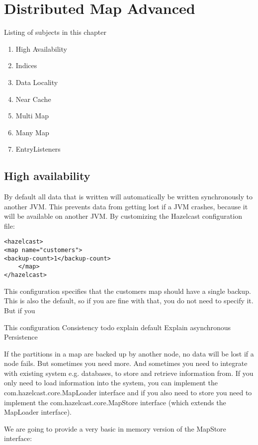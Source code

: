 \chapter{Distributed Map Advanced}

Listing of subjects in this chapter
\begin{enumerate}
\item High Availability
\item Indices
\item Data Locality
\item Near Cache
\item Multi Map
\item Many Map
\item EntryListeners
\end{enumerate}

\section{High availability}

By default all data that is written will automatically be written synchronously to another JVM. This prevents data from getting lost if a JVM crashes, because it will be available on another JVM. By customizing the Hazelcast configuration file:
\begin{verbatim}
<hazelcast> 
<map name="customers"> 
<backup-count>1</backup-count>
 	</map> 
</hazelcast>
\end{verbatim}

This configuration specifies that the customers map should have a single backup. This is also the default, so if you are fine with that, you do not need to specify it. But if you 

This configuration 
Consistency
todo explain default
Explain asynchronous
Persistence

If the partitions in a map are backed up by another node, no data will be lost if a node fails. But sometimes you need more. And sometimes you need to integrate with existing system e.g. databases, to store and retrieve information from. If you only need to load information into the system, you can implement the com.hazelcast.core.MapLoader interface and if you also need to store you need to implement the com.hazelcast.core.MapStore interface (which extends the MapLoader interface).

We are going to provide a very basic in memory version of the MapStore interface:

